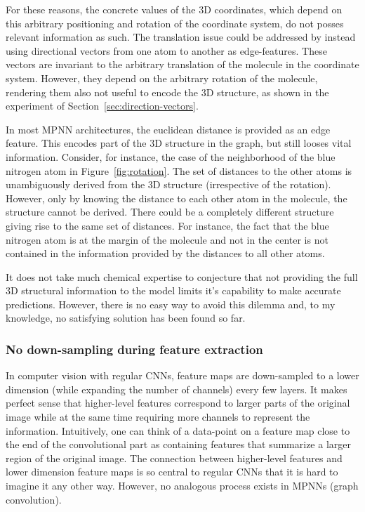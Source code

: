 For these reasons, the concrete values of the 3D coordinates, which depend on this arbitrary positioning and rotation of the coordinate system, do not posses relevant information as such. The translation issue could be addressed by instead using directional vectors from one atom to another as edge-features. These vectors are invariant to the arbitrary translation of the molecule in the coordinate system. However, they depend on the arbitrary rotation of the molecule, rendering them also not useful to encode the 3D structure, as shown in the experiment of Section~\ref{sec:direction-vectors}.

In most MPNN architectures, the euclidean distance is provided as an edge feature. This encodes part of the 3D structure in the graph, but still looses vital information. Consider, for instance, the case of the neighborhood of the blue nitrogen atom in Figure~\ref{fig:rotation}. The set of distances to the other atoms is unambiguously derived from the 3D structure (irrespective of the rotation). However, only by knowing the distance to each other atom in the molecule, the structure cannot be derived. There could be a completely different structure giving rise to the same set of distances. For instance, the fact that the blue nitrogen atom is at the margin of the molecule and not in the center is not contained in the information provided by the distances to all other atoms.


It does not take much chemical expertise to conjecture that not providing the full 3D structural information to the model limits it's capability to make accurate predictions. However, there is no easy way to avoid this dilemma and, to my knowledge, no satisfying solution has been found so far.

\subsubsection{No down-sampling during feature extraction}

In computer vision with regular CNNs, feature maps are down-sampled to a lower dimension (while expanding the number of channels) every few layers. It makes perfect sense that higher-level features correspond to larger parts of the original image while at the same time requiring more channels to represent the information. Intuitively, one can think of a data-point on a feature map close to the end of the convolutional part as containing features that summarize a larger region of the original image. The connection between higher-level features and lower dimension feature maps is so central to regular CNNs that it is hard to imagine it any other way. However, no analogous process exists in MPNNs (graph convolution).

